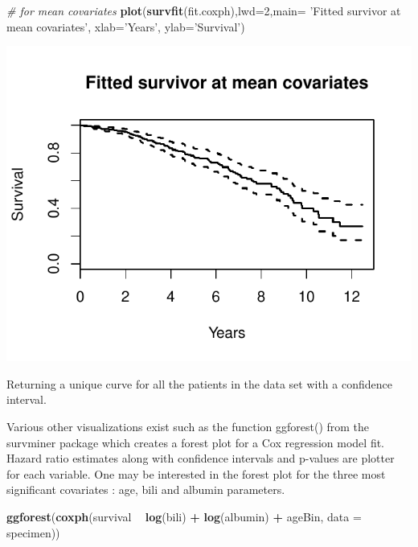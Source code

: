 \documentclass[]{article}
\newenvironment{Shaded}{\begin{snugshade}}{\end{snugshade}}
\newcommand{\KeywordTok}[1]{\textcolor[rgb]{0.13,0.29,0.53}{\textbf{#1}}}
\newcommand{\DataTypeTok}[1]{\textcolor[rgb]{0.13,0.29,0.53}{#1}}
\newcommand{\DecValTok}[1]{\textcolor[rgb]{0.00,0.00,0.81}{#1}}
\newcommand{\StringTok}[1]{\textcolor[rgb]{0.31,0.60,0.02}{#1}}
\newcommand{\CommentTok}[1]{\textcolor[rgb]{0.56,0.35,0.01}{\textit{#1}}}
\newcommand{\OperatorTok}[1]{\textcolor[rgb]{0.81,0.36,0.00}{\textbf{#1}}}
\newcommand{\NormalTok}[1]{#1}
\begin{document}
\begin{Shaded}
\begin{Highlighting}[]
\CommentTok{# for mean covariates}
\KeywordTok{plot}\NormalTok{(}\KeywordTok{survfit}\NormalTok{(fit.coxph),}\DataTypeTok{lwd=}\DecValTok{2}\NormalTok{,}\DataTypeTok{main=} \StringTok{'Fitted survivor at mean covariates'}\NormalTok{, }
     \DataTypeTok{xlab=}\StringTok{'Years'}\NormalTok{, }\DataTypeTok{ylab=}\StringTok{'Survival'}\NormalTok{)}
\end{Highlighting}
\end{Shaded}

\includegraphics{survival_pbc_files/figure-latex/unnamed-chunk-35-2.pdf}

Returning a unique curve for all the patients in the data set with a
confidence interval.

Various other visualizations exist such as the function ggforest() from
the survminer package which creates a forest plot for a Cox regression
model fit. Hazard ratio estimates along with confidence intervals and
p-values are plotter for each variable. One may be interested in the
forest plot for the three most significant covariates : age, bili and
albumin parameters.

\begin{Shaded}
\begin{Highlighting}[]
\KeywordTok{ggforest}\NormalTok{(}\KeywordTok{coxph}\NormalTok{(survival }\OperatorTok{~}\StringTok{ }\KeywordTok{log}\NormalTok{(bili) }\OperatorTok{+}\StringTok{ }\KeywordTok{log}\NormalTok{(albumin) }\OperatorTok{+}\StringTok{ }\NormalTok{ageBin, }\DataTypeTok{data =}\NormalTok{ specimen))}
\end{Highlighting}
\end{Shaded}
\end{document}
